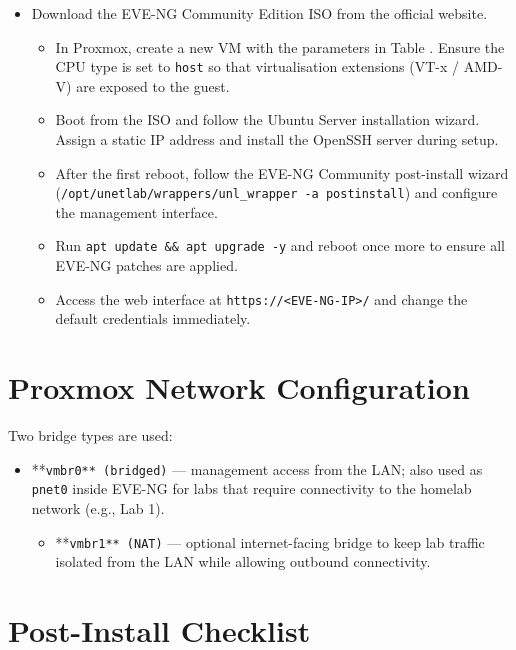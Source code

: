 \begin{itemize}
\tightlist
\item
  Download the EVE-NG Community Edition ISO from the official website.

  \begin{itemize}
  \tightlist
  \item
    In Proxmox, create a new VM with the parameters in Table . Ensure the CPU type is set to \texttt{host} so that virtualisation extensions (VT-x / AMD-V) are exposed to the guest.
  \item
    Boot from the ISO and follow the Ubuntu Server installation wizard. Assign a static IP address and install the OpenSSH server during setup.
  \item
    After the first reboot, follow the EVE-NG Community post-install wizard (\texttt{/opt/unetlab/wrappers/unl\_wrapper\ -a\ postinstall}) and configure the management interface.
  \item
    Run \texttt{apt\ update\ \&\&\ apt\ upgrade\ -y} and reboot once more to ensure all EVE-NG patches are applied.
  \item
    Access the web interface at \texttt{https://\textless{}EVE-NG-IP\textgreater{}/} and change the default credentials immediately.
  \end{itemize}
\end{itemize}

\section{Proxmox Network Configuration}

Two bridge types are used:

\begin{itemize}
\tightlist
\item
  **\texttt{vmbr0**\ (bridged)} --- management access from the LAN; also used as \texttt{pnet0} inside EVE-NG for labs that require connectivity to the homelab network (e.g., Lab 1).

  \begin{itemize}
  \tightlist
  \item
    **\texttt{vmbr1**\ (NAT)} --- optional internet-facing bridge to keep lab traffic isolated from the LAN while allowing outbound connectivity.
  \end{itemize}
\end{itemize}

\section{Post-Install Checklist}

